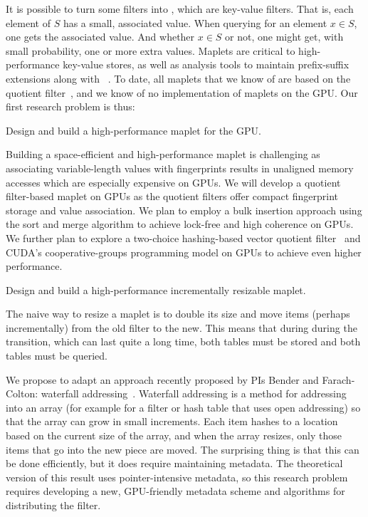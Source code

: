
It is possible to turn some filters into , which are key-value filters.  That is, each element of $S$ has a small, associated value.  When querying for an element $x\in S$, one gets the associated value.  And whether $x\in S$ or not, one might get, with small probability, one or more extra values.  Maplets are critical to high-performance key-value stores, as well as \kmer analysis tools to maintain prefix-suffix extensions along with \kmers~\cite{GeorganasEHG18}.  To date, all maplets that we know of are based on the quotient filter~\cite{conway2020splinterdb,PandeyBJP17}, and we know of no implementation of maplets on the GPU\@.
%
Our first research problem is thus:

\begin{rproblem}
Design and build a high-performance maplet for the GPU\@.
\end{rproblem}

Building a space-efficient and high-performance maplet is challenging as associating variable-length values with fingerprints results in unaligned memory accesses which are especially expensive on GPUs. We will develop a quotient filter-based maplet on GPUs as the quotient filters offer compact fingerprint storage and value association. We plan to employ a bulk insertion approach using the sort and merge algorithm to achieve lock-free and high coherence on GPUs. We further plan to explore a two-choice hashing-based vector quotient filter~\cite{PandeyCDBFJ21} and CUDA's cooperative-groups programming model on GPUs to achieve even higher performance.

\begin{rproblem}\label{rprob:resizable-maplet}
Design and build a high-performance incrementally resizable maplet.
\end{rproblem}
The naive way to resize a maplet is to double its size and move items (perhaps incrementally) from the old filter to the new.  This means that during during the transition, which can last quite a long time, both tables must be stored and both tables must be queried. 

We propose to adapt an approach recently proposed by PIs Bender and Farach-Colton: waterfall addressing~\cite{Bender2022}.   Waterfall addressing is a method for addressing into an array (for example for a filter or hash table that uses open addressing) so that the array can grow in small increments.  Each item hashes to a location based on the current size of the array, and when the array resizes, only those items that go into the new piece are moved.  The surprising thing is that this can be done efficiently, but it does require maintaining metadata.  The theoretical version of this result uses pointer-intensive metadata, so this research problem requires developing a new, GPU-friendly metadata scheme and algorithms for distributing the filter.


